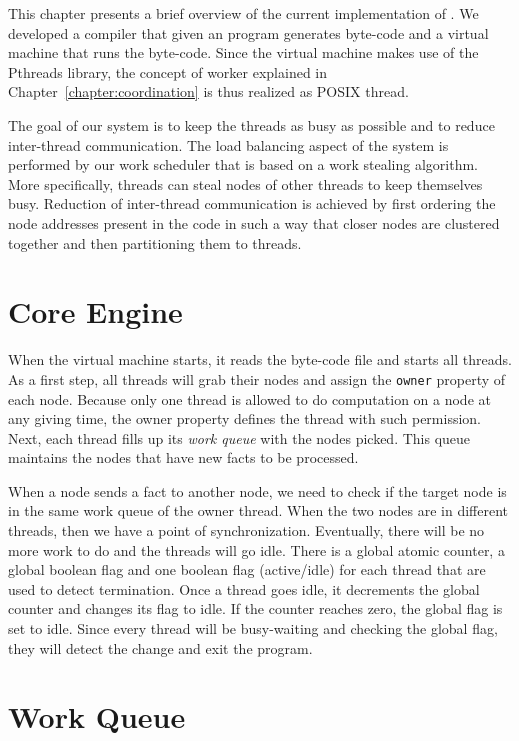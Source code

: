 This chapter presents a brief overview of the current implementation of \lang.
We developed a compiler that given an \lang program generates \lang byte-code and a virtual machine that runs the byte-code.
Since the virtual machine makes use of the Pthreads library, the concept of worker explained in Chapter~\ref{chapter:coordination} is thus realized as POSIX thread.

The goal of our system is to keep the threads as busy as possible and to reduce inter-thread communication.
The load balancing aspect of the system is performed by our work scheduler that is based on a work
stealing algorithm. More specifically, threads can steal nodes of other threads to keep themselves busy.
Reduction of inter-thread communication is achieved by first ordering the node addresses present in the code
in such a way that closer nodes are clustered together and then partitioning them to threads.

\section{Core Engine}

When the virtual machine starts, it reads the byte-code file and starts all threads.
As a first step, all threads will grab their nodes and assign the \texttt{owner} property of each node.
Because only one thread is allowed to do computation on a node at any giving time, the owner property
defines the thread with such permission.
Next, each thread fills up its \emph{work queue} with the nodes picked. This queue
maintains the nodes that have new facts to be processed.

When a node sends a fact to another node, we need to check if the target node is in the same work queue of the owner thread.
When the two nodes are in different threads, then we have a point of synchronization. Eventually,
there will be no more work to do and the threads will go idle. There is a global atomic counter, a global
boolean flag and one boolean flag (active/idle) for each thread that are used to detect termination.
Once a thread goes idle, it decrements the global counter and changes its flag to idle. If the counter
reaches zero, the global flag is set to idle. Since every thread will be busy-waiting and checking
the global flag, they will detect the change and exit the program.

\section{Work Queue}

